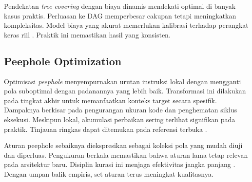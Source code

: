 \documentclass[../main.tex]{subfiles}
\begin{document}
Pendekatan \emph{tree covering} dengan biaya dinamis mendekati optimal di banyak kasus praktis. Perluasan ke DAG memperbesar cakupan tetapi meningkatkan kompleksitas. Model biaya yang akurat memerlukan kalibrasi terhadap perangkat keras riil \citep{WikiInstructionSelection}. Praktik ini memastikan hasil yang konsisten.

\subsection{Peephole Optimization}
Optimisasi \emph{peephole} menyempurnakan urutan instruksi lokal dengan mengganti pola suboptimal dengan padanannya yang lebih baik. Transformasi ini dilakukan pada tingkat akhir untuk memanfaatkan konteks target secara spesifik. Dampaknya berkisar pada pengurangan ukuran kode dan penghematan siklus eksekusi. Meskipun lokal, akumulasi perbaikan sering terlihat signifikan pada praktik. Tinjauan ringkas dapat ditemukan pada referensi terbuka \citep{WikiPeephole}.

Aturan peephole sebaiknya diekspresikan sebagai koleksi pola yang mudah diuji dan diperluas. Pengukuran berkala memastikan bahwa aturan lama tetap relevan pada arsitektur baru. Disiplin kurasi ini menjaga efektivitas jangka panjang \citep{WikiPeephole}. Dengan umpan balik empiris, set aturan terus meningkat kualitasnya.

\IfSubfilesClassLoaded{%


}{}
\end{document}
